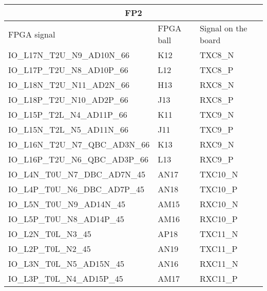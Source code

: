 \begin{footnotesize}
\begin{longtable}{|p{7cm}|p{1cm}|p{5cm}|}
		
			\multicolumn{3}{|c|}{\textbf{\large{FP2}}}\\ \hline
FPGA signal	&	FPGA ball	&	Signal on the board	\\ \hline
IO\_L17N\_T2U\_N9\_AD10N\_66	&	K12	&	TXC8\_N	\\ \hline
IO\_L17P\_T2U\_N8\_AD10P\_66	&	L12	&	TXC8\_P	\\ \hline
IO\_L18N\_T2U\_N11\_AD2N\_66	&	H13	&	RXC8\_N	\\ \hline
IO\_L18P\_T2U\_N10\_AD2P\_66	&	J13	&	RXC8\_P	\\ \hline
IO\_L15P\_T2L\_N4\_AD11P\_66	&	K11	&	TXC9\_N	\\ \hline
IO\_L15N\_T2L\_N5\_AD11N\_66	&	J11	&	TXC9\_P	\\ \hline
IO\_L16N\_T2U\_N7\_QBC\_AD3N\_66	&	K13	&	RXC9\_N	\\ \hline
IO\_L16P\_T2U\_N6\_QBC\_AD3P\_66	&	L13	&	RXC9\_P	\\ \hline
IO\_L4N\_T0U\_N7\_DBC\_AD7N\_45	&	AN17	&	TXC10\_N	\\ \hline
IO\_L4P\_T0U\_N6\_DBC\_AD7P\_45	&	AN18	&	TXC10\_P	\\ \hline
IO\_L5N\_T0U\_N9\_AD14N\_45	&	AM15	&	RXC10\_N	\\ \hline
IO\_L5P\_T0U\_N8\_AD14P\_45	&	AM16	&	RXC10\_P	\\ \hline
IO\_L2N\_T0L\_N3\_45	&	AP18	&	TXC11\_N	\\ \hline
IO\_L2P\_T0L\_N2\_45	&	AN19	&	TXC11\_P	\\ \hline
IO\_L3N\_T0L\_N5\_AD15N\_45	&	AN16	&	RXC11\_N	\\ \hline
IO\_L3P\_T0L\_N4\_AD15P\_45	&	AM17	&	RXC11\_P	\\ \hline


\end{longtable}
\end{footnotesize}
